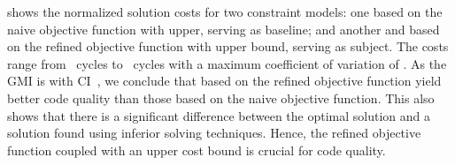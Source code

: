  shows the normalized
\gls{solution} costs for two \glspl{constraint model}: one based on the naive
\gls{objective function} with upper, serving as \gls{baseline}; and another and
based on the refined \gls{objective function} with upper bound, serving as
\gls{subject}.
%
The costs range from
\numMinOf[round-precision=0]{
  \ObjFunRefinedVsNaiveCyclesSpeedupNaiveWUbCyclesAvgMin,
  \ObjFunRefinedVsNaiveCyclesSpeedupRefinedWUbCyclesAvgMin
}~cycles to
\numMaxOf[round-precision=0]{
  \ObjFunRefinedVsNaiveCyclesSpeedupNaiveWUbCyclesAvgMax,
  \ObjFunRefinedVsNaiveCyclesSpeedupRefinedWUbCyclesAvgMax
}~cycles with a maximum coefficient of variation of
\numMaxOf{
  \ObjFunRefinedVsNaiveCyclesSpeedupNaiveWUbCyclesCvMax,
  \ObjFunRefinedVsNaiveCyclesSpeedupRefinedWUbCyclesCvMax
}.
%
As the \gls{GMI} is \printGMI{%
  \ObjFunRefinedVsNaiveCyclesSpeedupRefinedVsNaiveWUbCyclesRegularSpeedupGmean%
} with \gls{CI}~\printGMICI{%
  \ObjFunRefinedVsNaiveCyclesSpeedupRefinedVsNaiveWUbCyclesRegularSpeedupCiMin%
}{%
  \ObjFunRefinedVsNaiveCyclesSpeedupRefinedVsNaiveWUbCyclesRegularSpeedupCiMax%
}, we conclude that  based on the refined
\gls{objective function} yield better code quality than those based on the naive
\gls{objective function}.
%
This also shows that there is a significant difference between the optimal
\gls{solution} and a \gls{solution} found using inferior solving techniques.
%
Hence, the refined \gls{objective function} coupled with an upper cost bound is
crucial for code quality.




